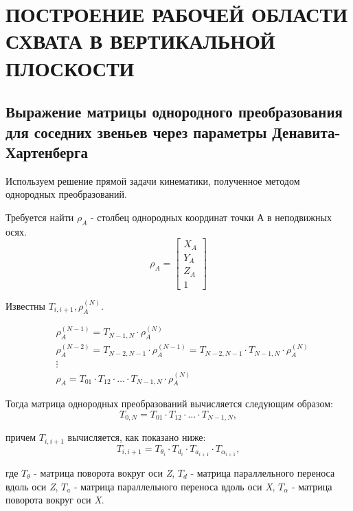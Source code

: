 \chapter{\MakeUppercase{Построение рабочей области схвата в вертикальной плоскости}}

\section{Выражение матрицы однородного преобразования для соседних
звеньев через параметры Денавита-Хартенберга}
Используем решение прямой задачи кинематики, полученное методом однородных преобразований.

Требуется найти $ \rho_A $ - столбец однородных координат точки $ А $ в неподвижных осях.
$$ \rho_A=\begin{bmatrix}
X_A \\
Y_A \\
Z_A \\
1
\end{bmatrix} $$

Известны $ T_{i, i+1} , \rho_A^{(N)}$.

\begin{align*}
    & \rho_A^{(N-1)}=T_{N-1, N}\cdot \rho_A^{(N)} \\
    & \rho_A^{(N-2)}=T_{N-2, N-1}\cdot \rho_A^{(N-1)}=T_{N-2, N-1}\cdot T_{N-1,N} \cdot \rho_A^{(N)} \\
    & \vdots  \\
    & \rho_{A} =T_{01}\cdot T_{12}\cdot \dots \cdot T_{N-1, N} \cdot \rho_A^{(N)}
\end{align*}

Тогда матрица однородных преобразований вычисляется следующим образом: 
$$ T_{0, N}=T_{01}\cdot T_{12}\cdot \dots \cdot T_{N-1, N}, $$

\noindent причем $ T_{i, i+1} $ вычисляется, как показано ниже:
$$  T_{i, i+1} = T_{\theta_i} \cdot T_{d_i} \cdot T_{a_{i+1}} \cdot T_{\alpha_{i+1}}, $$

\noindent где $ T_\theta $ - матрица поворота вокруг оси \textit{Z}, $ T_d $ - матрица параллельного переноса вдоль оси \textit{Z}, $ T_a $ - матрица параллельного переноса вдоль оси \textit{X}, $ T_\alpha $ - матрица поворота вокруг оси \textit{X}.

